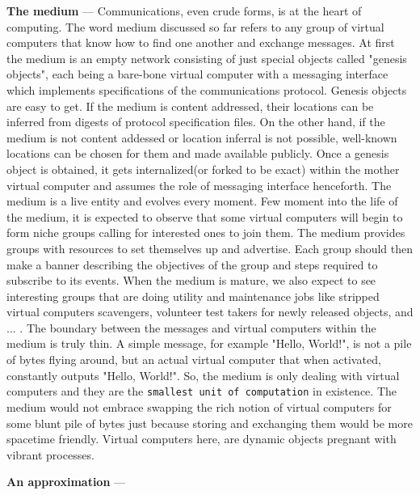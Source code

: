 \documentclass[a4paper, 10pt]{article}
\begin{document}
\textbf{The medium} --- Communications, even crude forms, is at the heart of computing. The word medium discussed so far refers to any group of virtual computers that know how to find one another and exchange messages. At first the medium is an empty network consisting of just special objects called "genesis objects", each being a bare-bone virtual computer with a messaging interface which implements specifications of the communications protocol. Genesis objects are easy to get. If the medium is content addressed, their locations can be inferred from digests of protocol specification files. On the other hand, if the medium is not content addessed or location inferral is not possible, well-known locations can be chosen for them and made available publicly. Once a genesis object is obtained, it gets internalized(or forked to be exact) within the mother virtual computer and assumes the role of messaging interface henceforth. The medium is a live entity and evolves every moment. Few moment into the life of the medium, it is expected to observe that some virtual computers will begin to form niche groups calling for interested ones to join them. The medium provides groups with resources to set themselves up and advertise. Each group should then make a banner describing the objectives of the group and steps required to subscribe to its events. When the medium is mature, we also expect to see interesting groups that are doing utility and maintenance jobs like stripped virtual computers scavengers, volunteer test takers for newly released objects, and ... . The boundary between the messages and virtual computers within the medium is truly thin. A simple message, for example "Hello, World!", is not a pile of bytes flying around, but an actual virtual computer that when activated, constantly outputs "Hello, World!". So, the medium is only dealing with virtual computers and they are the \texttt{smallest unit of computation} in existence. The medium would not embrace swapping the rich notion of virtual computers for some blunt pile of bytes just because storing and exchanging them would be more spacetime friendly. Virtual computers here, are dynamic objects pregnant with vibrant processes. 
\par
\textbf{An approximation} --- 
\end{document}
